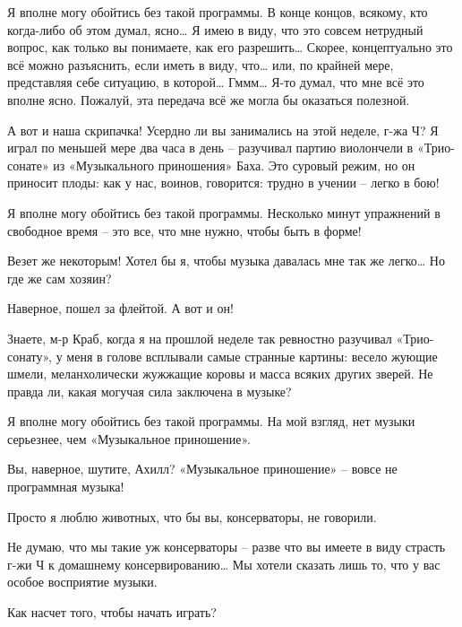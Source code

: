 \documentclass[../main.tex]{subfiles}
\begin{document}
\begin{dialogue}

 Я вполне могу обойтись без такой программы. В конце концов, всякому, кто когда-либо об этом думал, ясно\ldots{} Я имею в виду, что это совсем нетрудный вопрос, как только вы понимаете, как его разрешить\ldots{} Скорее, концептуально это всё можно разъяснить, если иметь в виду, что\ldots{} или, по крайней мере, представляя себе ситуацию, в которой\ldots{} Гммм\ldots{} Я-то думал, что мне всё это вполне ясно. Пожалуй, эта передача всё же могла бы оказаться полезной.


А вот и наша скрипачка! Усердно ли вы занимались на этой неделе, г-жа Ч? Я играл по меньшей мере два часа в день \--- разучивал партию виолончели в «Трио-сонате» из «Музыкального приношения» Баха. Это суровый режим, но он приносит плоды: как у нас, воинов, говорится: трудно в учении \--- легко в бою!

 Я вполне могу обойтись без такой программы. Несколько минут упражнений в свободное время \--- это все, что мне нужно, чтобы быть в форме!

 Везет же некоторым! Хотел бы я, чтобы музыка давалась мне так же легко\ldots{} Но где же сам хозяин?

 Наверное, пошел за флейтой. А вот и он!


 Знаете, м-р Краб, когда я на прошлой неделе так ревностно разучивал «Трио-сонату», у меня в голове всплывали самые странные картины: весело жующие шмели, меланхолически жужжащие коровы и масса всяких других зверей. Не правда ли, какая могучая сила заключена в музыке?

 Я вполне могу обойтись без такой программы. На мой взгляд, нет музыки серьезнее, чем «Музыкальное приношение».

 Вы, наверное, шутите, Ахилл? «Музыкальное приношение» \--- вовсе не программная музыка!

 Просто я люблю животных, что бы вы, консерваторы, не говорили.

 Не думаю, что мы такие уж консерваторы \--- разве что вы имеете в виду страсть г-жи Ч к домашнему консервированию\ldots{} Мы хотели сказать лишь то, что у вас особое восприятие музыки.

 Как насчет того, чтобы начать играть?


\end{dialogue}
\end{document}
